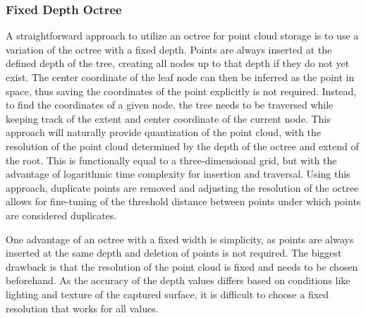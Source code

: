 \subsubsection{Fixed Depth Octree}
A straightforward approach to utilize an octree for point cloud storage is to use a variation of the octree with a fixed depth.
Points are always inserted at the defined depth of the tree, creating all nodes up to that depth if they do not yet exist.
The center coordinate of the leaf node can then be inferred as the point in space,
thus saving the coordinates of the point explicitly is not required.
Instead, to find the coordinates of a given node, the tree needs to be traversed while keeping track of
the extent and center coordinate of the current node.
This approach will naturally provide quantization of the point cloud, with the resolution of the point cloud
determined by the depth of the octree and extend of the root.
This is functionally equal to a three-dimensional grid,
but with the advantage of logarithmic time complexity for insertion and traversal.
Using this approach, duplicate points are removed and adjusting the resolution of the octree
allows for fine-tuning of the threshold distance between points under which points are considered duplicates.

One advantage of an octree with a fixed width is simplicity, as points are always inserted at the same depth and deletion of points is not required.
The biggest drawback is that the resolution of the point cloud is fixed and needs to be chosen beforehand.
As the accuracy of the depth values differs based on conditions like lighting and texture of the captured surface,
it is difficult to choose a fixed resolution that works for all values.


